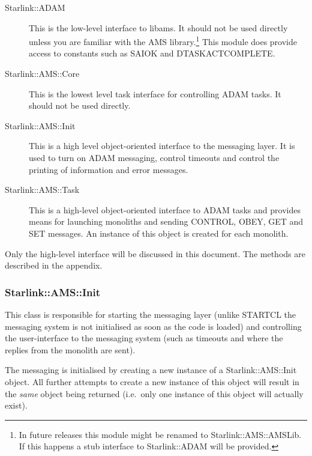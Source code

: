 \documentclass[twoside,11pt]{article}
\newcommand{\xref}[3]{#1}
\renewcommand{\_}{\texttt{\symbol{95}}}
\begin{document}
\begin{description}
\item[Starlink::ADAM] 

This is the low-level interface to libams. It should not be used directly
unless you are familiar with the AMS library.\footnote{In future releases this 
module might be renamed to Starlink::AMS::AMSLib. If this happens a stub
interface to Starlink::ADAM will be provided.} This module does provide
access to constants such as SAI\_\_OK and DTASK\_\_ACTCOMPLETE.

\item[Starlink::AMS::Core]

This is the lowest level task interface for controlling ADAM tasks. It should
not be used directly.

\item[Starlink::AMS::Init]

This is a high level object-oriented interface to the messaging layer. It is
used to turn on ADAM messaging, control timeouts and control the printing
of information and error messages.

\item[Starlink::AMS::Task]

This is a high-level object-oriented interface to ADAM tasks and provides
means for launching monoliths and sending CONTROL, OBEY, GET and SET
messages. An instance of this object is created for each monolith.

\end{description}

Only the high-level interface will  be discussed in this document.
The methods are described in the appendix.

\subsubsection{Starlink::AMS::Init}


This class is responsible for starting the messaging layer (unlike
\xref{STARTCL}{sun186}{} the messaging system is not initialised as soon as
the code is loaded) and controlling the user-interface to the messaging system
(such as timeouts and where the replies from the monolith are sent).

The messaging is initialised by creating a new instance of 
a Starlink::AMS::Init object. All further attempts to create a new
instance of this object will result in the \emph{same} object being
returned (i.e.\ only one instance of this object will actually exist).
\end{document}
